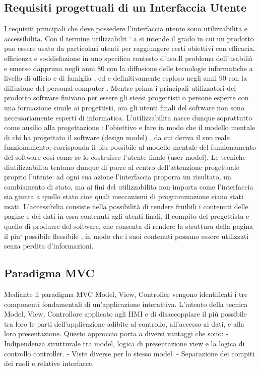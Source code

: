 \documentclass[12pt, a4paper, oneside]{book}
\begin{document}
\subsection{Requisiti progettuali di un Interfaccia Utente}
I requisiti principali che deve possedere l’interfaccia utente sono utilizzabilita e  accessibilita. Con il termine utilizzabilit ` a si intende il grado in cui un prodotto puo essere usato da particolari utenti per raggiungere certi obiettivi con efficacia, efficienza e soddisfazione in uno specifico contesto d’uso.Il problema dell’usabilià e emerso dapprima negli anni 80 con la diffusione delle tecnologie informatiche a livello di ufficio e di famiglia , ed e definitivamente esploso negli anni 
90 con la diffusione del personal computer . Mentre prima i principali utilizzatori del prodotto software finivano per essere gli stessi progettisti o persone esperte con una formazione simile ai progettisti, ora gli utenti finali del software non sono necessariamente esperti di informatica. L’utilizzabilita nasce dunque soprattutto come ausilio alla progettazione : l’obiettivo e fare in modo che il modello mentale di chi ha progettato il software (design model) , da cui deriva il suo reale funzionamento, corrisponda il piu possibile al modello mentale del funzionamento del software così come se lo costruisce l’utente finale (user model). Le tecniche diutilizzabilita tentano dunque di porre al centro dell’attenzione progettuale proprio l’utente: ad ogni sua azione l’interfaccia proporra un risultato, un cambiamento di stato, ma ai fini del utilizzabilita non importa come l’interfaccia sia giunta a quello stato cioe quali meccanismi di programmazione siano stati usati. L’accessibilia consiste nella possibilità di rendere fruibili i contenuti delle pagine e dei dati in essa contenuti agli utenti finali. Il compito del progettista e quello di produrre del software, che consenta di rendere la struttura della pagina il piu` possibile flessibile , in modo che i suoi contenuti possano essere utilizzati senza perdita d’informazioni.

\subsection{Paradigma MVC}
Mediante il paradigma MVC Model, View, Controller vengono identificati i tre componenti fondamentali di un’applicazione interattiva. L’intento della tecnica Model, View, Controllore applicato agli HMI e di disaccoppiare il più possibile  tra loro le parti dell’applicazione adibite al controllo, all’accesso ai dati, e alla loro presentazione. Questo approccio porta a diversi vantaggi che sono:
- Indipendenza strutturale tra model, logica di presentazione view e la logica
di controllo controller.
- Viste diverse per lo stesso model.
- Separazione dei compiti dei ruoli e relative interfacce.
\end{document}
